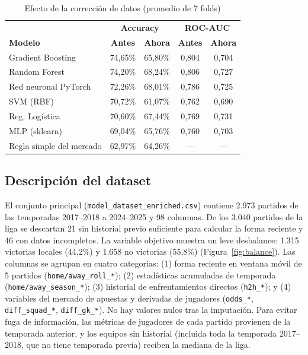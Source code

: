\documentclass{ieeeaccess}
\begin{document}
\begin{table}[!t]
\caption{Efecto de la corrección de datos (promedio de 7 folds)}
\label{tab:antes_despues}
\centering
\footnotesize
\setlength{\tabcolsep}{2.5pt}
\begin{tabular}{@{}lcccc@{}}
\toprule
 & \multicolumn{2}{c}{\textbf{Accuracy}} & \multicolumn{2}{c}{\textbf{ROC-AUC}} \\
\textbf{Modelo} & \textbf{Antes} & \textbf{Ahora} & \textbf{Antes} & \textbf{Ahora} \\
\midrule
Gradient Boosting & 74,65\% & 65,80\% & 0,804 & 0,704 \\
Random Forest & 74,20\% & 68,24\% & 0,806 & 0,727 \\
Red neuronal PyTorch & 72,26\% & 68,01\% & 0,786 & 0,725 \\
SVM (RBF) & 70,72\% & 61,07\% & 0,762 & 0,690 \\
Reg. Logística & 70,60\% & 67,44\% & 0,769 & 0,731 \\
MLP (sklearn) & 69,04\% & 65,76\% & 0,760 & 0,703 \\
\midrule
Regla simple del mercado & 62,97\% & 64,26\% & --- & --- \\
\bottomrule
\end{tabular}
\end{table}

\subsection{Descripción del dataset}
El conjunto principal (\texttt{model\_dataset\_enriched.csv}) contiene 2.973 partidos de las temporadas 2017--2018 a 2024--2025 y 98 columnas. De los 3.040 partidos de la liga se descartan 21 sin historial previo suficiente para calcular la forma reciente y 46 con datos incompletos. La variable objetivo muestra un leve desbalance: 1.315 victorias locales (44,2\%) y 1.658 no victorias (55,8\%) (Figura~\ref{fig:balance}). Las columnas se agrupan en cuatro categorías: (1) forma reciente en ventana móvil de 5 partidos (\texttt{home/away\_roll\_*}); (2) estadísticas acumuladas de temporada (\texttt{home/away\_season\_*}); (3) historial de enfrentamientos directos (\texttt{h2h\_*}); y (4) variables del mercado de apuestas y derivadas de jugadores (\texttt{odds\_*}, \texttt{diff\_squad\_*}, \texttt{diff\_gk\_*}). No hay valores nulos tras la imputación. Para evitar fuga de información, las métricas de jugadores de cada partido provienen de la temporada anterior, y los equipos sin historial (incluida toda la temporada 2017--2018, que no tiene temporada previa) reciben la mediana de la liga.
\end{document}
